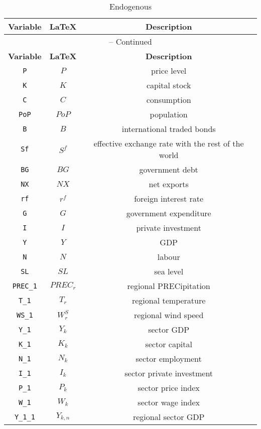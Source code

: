\begin{center}
\begin{longtable}{ccc}
\caption{Endogenous}\\%
\hline%
\multicolumn{1}{c}{\textbf{Variable}} &
\multicolumn{1}{c}{\textbf{\LaTeX}} &
\multicolumn{1}{c}{\textbf{Description}}\\%
\hline\hline%
\endfirsthead
\multicolumn{3}{c}{{\tablename} \thetable{} -- Continued}\\%
\hline%
\multicolumn{1}{c}{\textbf{Variable}} &
\multicolumn{1}{c}{\textbf{\LaTeX}} &
\multicolumn{1}{c}{\textbf{Description}}\\%
\hline\hline%
\endhead
\texttt{P} & $P$ & price level\\
\texttt{K} & $K$ & capital stock\\
\texttt{C} & $C$ & consumption\\
\texttt{PoP} & $PoP$ & population\\
\texttt{B} & $B$ & international traded bonds\\
\texttt{Sf} & $S^{f}$ & effective exchange rate with the rest of the world\\
\texttt{BG} & $BG$ & government debt\\
\texttt{NX} & $NX$ & net exports\\
\texttt{rf} & ${r^{f}}$ & foreign interest rate\\
\texttt{G} & $G$ & government expenditure\\
\texttt{I} & $I$ & private investment\\
\texttt{Y} & $Y$ & GDP\\
\texttt{N} & $N$ & labour\\
\texttt{SL} & ${SL}$ & sea level\\
\texttt{PREC\_1} & ${PREC_{r}}$ & regional PRECipitation\\
\texttt{T\_1} & ${T_{r}}$ & regional temperature\\
\texttt{WS\_1} & ${W_{r}^{S}}$ & regional wind speed\\
\texttt{Y\_1} & ${Y_k}$ & sector GDP\\
\texttt{K\_1} & ${K_k}$ & sector capital\\
\texttt{N\_1} & ${N_k}$ & sector employment\\
\texttt{I\_1} & ${I_k}$ & sector private investment\\
\texttt{P\_1} & ${P_k}$ & sector price index\\
\texttt{W\_1} & ${W_k}$ & sector wage index\\
\texttt{Y\_1\_1} & ${Y_{k,n}}$ & regional sector GDP\\

\end{longtable}
\end{center}
